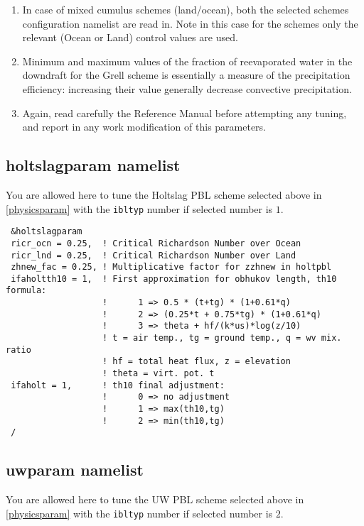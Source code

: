 \begin{enumerate}
\item In case of mixed cumulus schemes (land/ocean), both the selected
schemes configuration namelist are read in.  Note in this case for the
schemes only the relevant (Ocean or Land) control values are used.
\item Minimum and maximum values of the fraction of reevaporated water in the
downdraft for the Grell scheme is essentially a measure of the precipitation
efficiency: increasing their value generally decrease convective precipitation.
\item Again, read carefully the Reference Manual before attempting any tuning,
and report in any work modification of this parameters.
\end{enumerate}

\subsection{holtslagparam namelist}

You are allowed here to tune the Holtslag PBL scheme selected above in
\ref{physicsparam} with the \verb=ibltyp= number if selected number is
$1$. 

{\footnotesize
\begin{Verbatim}
 &holtslagparam
 ricr_ocn = 0.25,  ! Critical Richardson Number over Ocean
 ricr_lnd = 0.25,  ! Critical Richardson Number over Land
 zhnew_fac = 0.25, ! Multiplicative factor for zzhnew in holtpbl
 ifaholtth10 = 1,  ! First approximation for obhukov length, th10 formula:
                   !      1 => 0.5 * (t+tg) * (1+0.61*q)
                   !      2 => (0.25*t + 0.75*tg) * (1+0.61*q)
                   !      3 => theta + hf/(k*us)*log(z/10)
                   ! t = air temp., tg = ground temp., q = wv mix. ratio
                   ! hf = total heat flux, z = elevation
                   ! theta = virt. pot. t
 ifaholt = 1,      ! th10 final adjustment:
                   !      0 => no adjustment
                   !      1 => max(th10,tg)
                   !      2 => min(th10,tg)
 /
\end{Verbatim}
}

\subsection{uwparam namelist}

You are allowed here to tune the UW PBL scheme selected above in
\ref{physicsparam} with the \verb=ibltyp= number if selected number is
$2$. 

